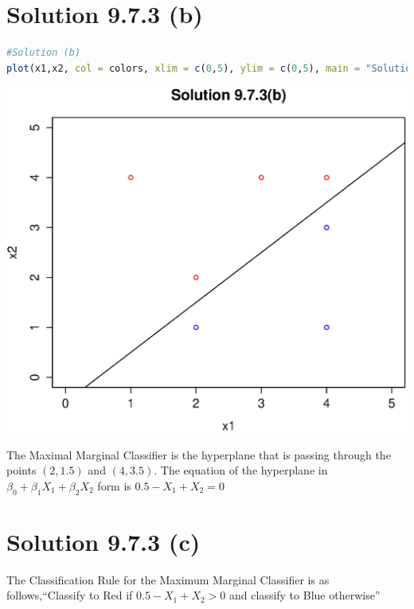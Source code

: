 \documentclass[a4paper,10pt]{article}
\begin{document}
\section{Solution 9.7.3 (b)}
\begin{lstlisting}[language=R]
#Solution (b)
plot(x1,x2, col = colors, xlim = c(0,5), ylim = c(0,5), main = "Solution 9.7.3(b)", abline(-0.5,1))
\end{lstlisting}
\begin{center}
\includegraphics[scale=0.70]{second}
\end{center}
The Maximal Marginal Classifier is the hyperplane that is passing through the points $(2,1.5)$ and $(4,3.5)$.\newline
The equation of the hyperplane in $\beta_0 + \beta_1X_1 + \beta_2X_2$ form \newline is $0.5-X_1+X_2=0$
\newpage
\section{Solution 9.7.3 (c)}
The Classification Rule for the Maximum Marginal Classifier is as follows,\newline ``Classify to Red if $0.5-X_1+X_2>0$ and classify to Blue otherwise''
\end{document}
